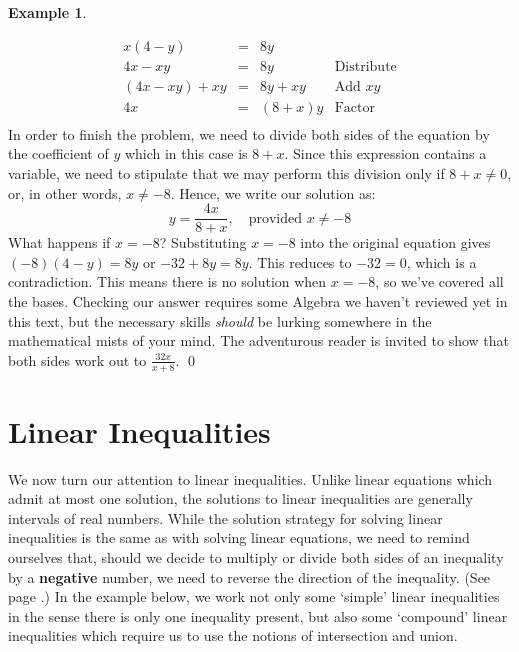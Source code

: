 \documentclass[11pt]{article}
\theoremstyle{definition}  %
\newtheorem{ex}{\bf Example}[section]
\begin{document}
\begin{ex}
\begin{enumerate}
\[\begin{array}{rclr}
x(4-y) & = & 8y & \\

4x - xy & = & 8y & \text{Distribute} \\

(4x - xy) + xy & = & 8y + xy & \text{Add $xy$} \\

4x & = & (8+x)y & \text{Factor} \\ \end{array}\]In order to finish the problem, we need to divide both sides of the equation by the coefficient of $y$ which in this case is $8+x$.  Since this expression contains a variable, we need to stipulate that we may perform this division only if $8 + x \neq 0$, or, in other words, $x \neq -8$.  Hence, we write our solution as:\[ y = \dfrac{4x}{8+x}, \quad \text{provided $x \neq -8$}\] What happens if $x = -8$?  Substituting $x = -8$ into the original equation gives $(-8)(4-y) = 8y$ or $-32 + 8y = 8y$.  This reduces to $-32 = 0$, which is a contradiction.  This means there is no solution when $x = -8$, so we've covered all the bases.  Checking our answer requires some Algebra we haven't reviewed yet in this text, but the necessary skills \emph{should} be lurking somewhere in the mathematical mists of your mind.  The adventurous reader is invited to show that both sides work out to $\frac{32x}{x+8}$. \qed

\end{enumerate}

\end{ex}

\section{Linear Inequalities}
\label{LinearInequal}

We now turn our attention to linear inequalities.  Unlike linear equations which admit at most one solution, the solutions to linear inequalities are generally intervals of real numbers.  While the solution strategy for solving linear inequalities is the same as with solving linear equations, we need to remind ourselves that, should we decide to multiply or divide both sides of an inequality by a \textbf{negative} number, we need to reverse the direction of the inequality. (See page \pageref{equivalenteqnineq}.)  In the example below, we work not only some `simple' linear inequalities in the sense there is only one inequality present, but also some `compound' linear inequalities which require us to use the notions of intersection and union. 
\end{document}
